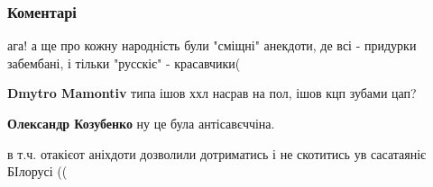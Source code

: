  
 
 
 
 
\subsubsection{Коментарі}
\label{sec:06_09_2021.fb.borodavko_andrej.1.druzhba_narodiv_mova.cmt}

\begin{itemize}
 
ага! а ще про кожну народність були "сміщні" анекдоти, де всі - придурки забембані, і тільки "русскіє" - красавчики(

\begin{itemize}
 
\textbf{Dmytro Mamontiv} типа ішов ххл насрав на пол, ішов кцп зубами цап?

 
\textbf{Олександр Козубенко} ну це була антісавєччіна.

 
в т.ч. отакієот аніхдоти дозволили дотриматись і не скотитись ув сасатаяніє БІлорусі ((
\end{itemize}


\end{itemize}
